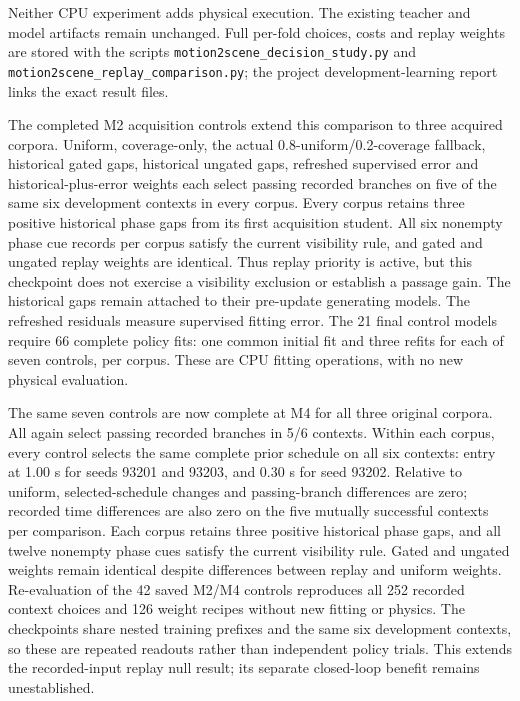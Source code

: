 Neither CPU experiment adds physical execution. The existing teacher and model
artifacts remain unchanged. Full per-fold choices, costs and replay weights are
stored with the scripts \texttt{motion2scene\_decision\_study.py} and
\texttt{motion2scene\_replay\_comparison.py}; the project development-learning
report links the exact result files.

The completed M2 acquisition controls extend this comparison to three acquired
corpora. Uniform, coverage-only, the actual 0.8-uniform/0.2-coverage fallback,
historical gated gaps, historical ungated gaps, refreshed supervised error and
historical-plus-error weights each select passing recorded branches on five of
the same six development contexts in every corpus. Every corpus retains three
positive historical phase gaps from its first acquisition student. All six
nonempty phase cue records per corpus satisfy the current visibility rule, and
gated and ungated replay weights are identical. Thus replay priority is active,
but this checkpoint does not exercise a visibility exclusion or establish a
passage gain. The historical gaps remain attached to their pre-update generating
models. The refreshed residuals measure supervised fitting error. The 21 final
control models require 66 complete policy fits: one common initial fit and
three refits for each of seven controls, per corpus. These are CPU fitting
operations, with no new physical evaluation.

The same seven controls are now complete at M4 for all three original corpora.
All again select passing recorded branches in 5/6 contexts. Within each corpus,
every control selects the same complete prior schedule on all six contexts:
entry at 1.00 s for seeds 93201 and 93203, and 0.30 s for seed 93202. Relative to
uniform, selected-schedule changes and passing-branch differences are zero;
recorded time differences are also zero on the five mutually successful contexts
per comparison. Each corpus retains three positive historical phase gaps, and
all twelve nonempty phase cues satisfy the current visibility rule. Gated and
ungated weights remain identical despite differences between replay and uniform
weights. Re-evaluation of the 42 saved M2/M4 controls reproduces all 252 recorded
context choices and 126 weight recipes without new fitting or physics. The
checkpoints share nested training prefixes and the same six development
contexts, so these are repeated readouts rather than independent policy trials.
This extends the recorded-input replay null result; its separate closed-loop
benefit remains unestablished.

